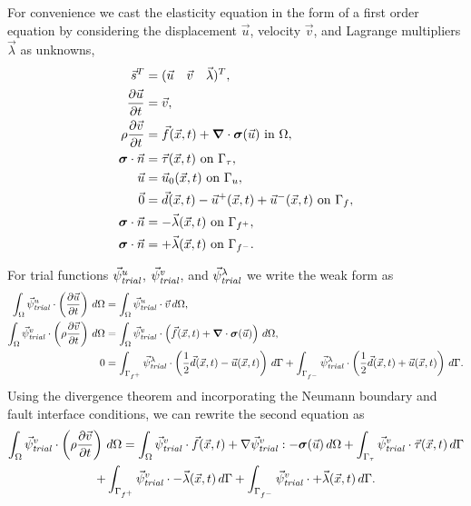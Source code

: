 For convenience we cast the elasticity equation in the form of a first order
equation by considering the displacement $\vec{u}$, velocity $\vec{v}$, and Lagrange multipliers $\vec{\lambda}$
as unknowns,
\begin{align}
  \vec{s}^T &= (\vec{u} \quad \vec{v} \quad \vec{\lambda})^T, \\
%
  \frac{\partial\vec{u}}{\partial t} &= \vec{v}, \\
%
  \rho \frac{\partial\vec{v}}{\partial t} &= \vec{f}(\vec{x},t) + \tensor{\nabla} \cdot 
\tensor{\sigma}(\vec{u}) 
\text{ in }\Omega, \\
  \tensor{\sigma} \cdot \vec{n} &= \vec{\tau}(\vec{x},t) \text{ on }\Gamma_\tau, \\
  \vec{u} &= \vec{u}_0(\vec{x},t) \text{ on }\Gamma_u, \\
  \vec{0} &= \vec{d}(\vec{x},t) - \vec{u}^+(\vec{x},t) + \vec{u}^-(\vec{x},t) \text{ on }\Gamma_f, \\
  \tensor{\sigma} \cdot \vec{n} &= -\vec{\lambda}(\vec{x},t) \text{ on }\Gamma_{f^+}, \\
  \tensor{\sigma} \cdot \vec{n} &= +\vec{\lambda}(\vec{x},t) \text{ on }\Gamma_{f^-}.
\end{align}

For trial functions $\trialvec[u]$, $\trialvec[v]$, and $\trialvec[\lambda]$ we write the weak form as
\begin{align}
  \int_\Omega \trialvec[u] \cdot \left( \frac{\partial \vec{u}}{\partial t} \right) \, d\Omega 
    &= \int_\Omega \trialvec[u] \cdot \vec{v} \, d\Omega, \\
%
  \int_\Omega \trialvec[v] \cdot \left( \rho \frac{\partial \vec{v}}{\partial t} \right) \, d\Omega &= 
  \int_\Omega \trialvec[v] \cdot \left( \vec{f}(\vec{x},t) + \tensor{\nabla} \cdot 
  \tensor{\sigma}(\vec{u}) \right) \, d\Omega, \\
  0 &= \int_{\Gamma_{f^+}} \trialvec[\lambda] \cdot \left( \frac{1}{2}\vec{d}(\vec{x},t) - \vec{u}(\vec{x},t) \right) \, d\Gamma
    + \int_{\Gamma_{f^-}} \trialvec[\lambda] \cdot \left( \frac{1}{2}\vec{d}(\vec{x},t) + \vec{u}(\vec{x},t) \right) \, d\Gamma.
\end{align}
Using the divergence theorem and incorporating the Neumann boundary
and fault interface conditions, we can rewrite the second equation as
\begin{multline}
  \int_\Omega \trialvec[v] \cdot \left( \rho \frac{\partial \vec{v}}{\partial t} \right) \, 
d\Omega =
  \int_\Omega \trialvec[v] \cdot \vec{f}(\vec{x},t) + \nabla \trialvec[v] : -\tensor{\sigma}
  (\vec{u}) \, d\Omega
  + \int_{\Gamma_\tau} \trialvec[v] \cdot \vec{\tau}(\vec{x},t) \, d\Gamma \\
+ \int_{\Gamma_{f^+}} \trialvec[v] \cdot -\vec{\lambda}(\vec{x},t) \, d\Gamma
+ \int_{\Gamma_{f^-}} \trialvec[v] \cdot +\vec{\lambda}(\vec{x},t) \, d\Gamma.
\end{multline}

